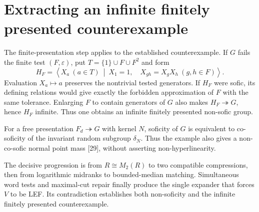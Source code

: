 \documentclass[10pt,openany]{book}
\newcommand{\refnum}[1]{\textnormal{[#1]}}
\begin{document}
\section{Extracting an infinite finitely presented counterexample}

The finite-presentation step applies to the established counterexample. If $G$ fails the finite test $(F,\varepsilon)$, put $T=\{1\}\cup F\cup F^2$ and form
\[
 H_F=
 \left\langle
 X_a\ (a\in T)
 \ \middle|\ 
 X_1=1,\quad X_{gh}=X_gX_h\ (g,h\in F)
 \right\rangle.
\]
Evaluation $X_a\mapsto a$ preserves the nontrivial tested generators. If $H_F$ were sofic, its defining relations would give exactly the forbidden approximation of $F$ with the same tolerance. Enlarging $F$ to contain generators of $G$ also makes $H_F\twoheadrightarrow G$, hence $H_F$ infinite. Thus one obtains an infinite finitely presented non-sofic group.

For a free presentation $F_d\twoheadrightarrow G$ with kernel $N$, soficity of $G$ is equivalent to co-soficity of the invariant random subgroup $\delta_N$. Thus the example also gives a non-co-sofic normal point mass \refnum{29}, without asserting non-hyperlinearity.

The decisive progression is from $R\cong M_2(R)$ to two compatible compressions, then from logarithmic midranks to bounded-median matching. Simultaneous word tests and maximal-cut repair finally produce the single expander that forces $V$ to be LEF. Its contradiction establishes both non-soficity and the infinite finitely presented counterexample.
\end{document}
